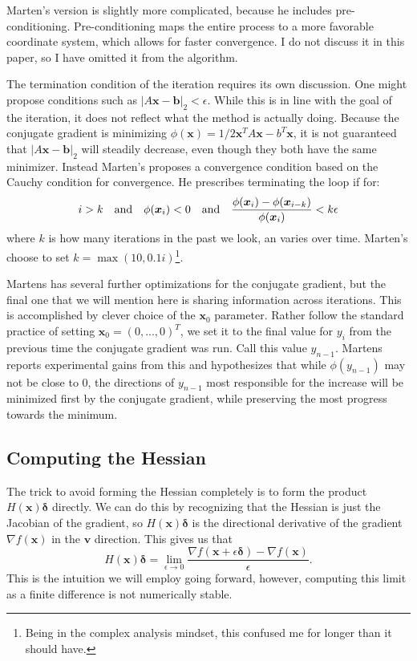 \documentclass[]{article}
\newcommand{\abs}[1]{\left|#1\right|}
\newcommand{\B}[1]{\boldsymbol{#1}}
\theoremstyle{plain}
\theoremstyle{definition}
\begin{document}
Marten's version is slightly more complicated, because he includes pre-conditioning. Pre-conditioning maps the entire process to a more favorable coordinate system, which allows for faster convergence. I do not discuss it in this paper, so I have omitted it from the algorithm.

The termination condition of the iteration requires its own discussion. One might propose conditions such as $ \abs{A\B{x} - \B{b}}_2 < \epsilon $. While this is in line with the goal of the iteration, it does not reflect what the method is actually doing. Because the conjugate gradient is minimizing $ \phi(\B{x}) = 1/2\B{x}^TA\B{x}-b^T\B{x} $, it is not guaranteed that $ \abs{A\B{x} - \B{b}}_2 $ will steadily decrease, even though they both have the same minimizer. Instead Marten's proposes a convergence condition based on the Cauchy condition for convergence. He prescribes terminating the loop if for:
\[ i > k \text{\quad and\quad} \phi(\B{x}_i) < 0 \text{\quad and\quad} \frac{\phi(\B{x}_i) - \phi(\B{x}_{i-k})}{\phi(\B{x}_i)}
< k\epsilon \]
where $ k $ is how many iterations in the past we look, an varies over time. Marten's choose to set $ k = \max(10, 0.1i) $\footnote{Being in the complex analysis mindset, this confused me for longer than it should have.}. 

Martens has several further optimizations for the conjugate gradient, but the final one that we will mention here is sharing information across iterations. This is accomplished by clever choice of the $ \B{x}_0 $ parameter. Rather follow the standard practice of setting $ \B{x}_0 = (0,...,0)^T $, we set it to the final value for $ y_i $ from the previous time the conjugate gradient was run. Call this value $ y_{n-1} $. Martens reports experimental gains from this and hypothesizes that while $ \phi(y_{n-1}) $ may not be close to 0, the directions of $ y_{n-1} $ most responsible for the increase will be minimized first by the conjugate gradient, while preserving the most progress towards the minimum.


\subsection{Computing the Hessian}
The trick to avoid forming the Hessian completely is to form the product $ H(\B{x})\B{\delta} $ directly. We can do this by recognizing that the Hessian is just the Jacobian of the gradient, so $ H(\B{x})\B{\delta} $ is the directional derivative of the gradient $ \nabla f(\B{x}) $ in the $ \B{v} $ direction. This gives us that
\[ H(\B{x})\B{\delta} = \lim\limits_{\epsilon\to0}\frac{\nabla f(\B{x} + \epsilon\B{\delta}) - \nabla f(\B{x})}{\epsilon}. \]
This is the intuition we will employ going forward, however, computing this limit as a finite difference is not numerically stable. 
\end{document}
